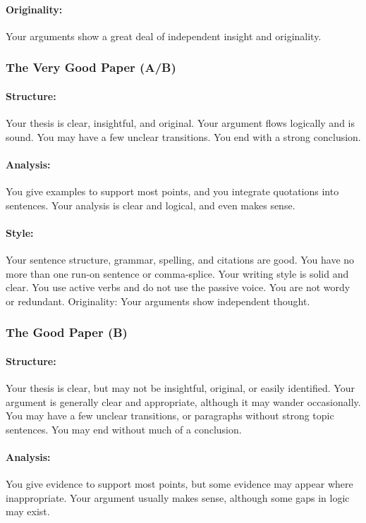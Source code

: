 \documentclass{article}
\begin{document}
\paragraph{Originality:} Your arguments show a great deal of independent insight and originality.\\


\subsubsection{The Very Good Paper (A/B)}
\paragraph{Structure:} Your thesis is clear, insightful, and original. Your argument flows logically and is sound. You may have a few unclear transitions. You end with a strong conclusion.
\paragraph{Analysis:} You give examples to support most points, and you integrate quotations into sentences. Your analysis is clear and logical, and even makes sense.
\paragraph{Style:} Your sentence structure, grammar, spelling, and citations are good. You have no more than one run-on sentence or comma-splice. Your writing style is solid and clear. You use active verbs and do not use the passive voice. You are not wordy or redundant.
Originality: Your arguments show independent thought.

\subsubsection{The Good Paper (B)}
\paragraph{Structure:} Your thesis is clear, but may not be insightful, original, or easily identified. Your argument is generally clear and appropriate, although it may wander occasionally. You may have a few unclear transitions, or paragraphs without strong topic sentences. You may end without much of a conclusion.
\paragraph{Analysis:} You give evidence to support most points, but some evidence may appear where inappropriate. Your argument usually makes sense, although some gaps in logic may exist.
\end{document}
